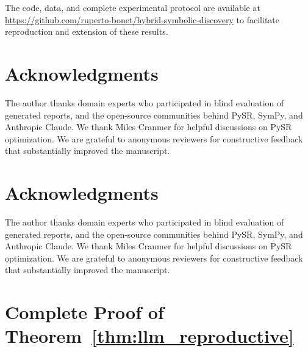 \documentclass[twoside,11pt]{article}
\begin{document}
The code, data, and complete experimental protocol are available at \url{https://github.com/ruperto-bonet/hybrid-symbolic-discovery} to facilitate reproduction and extension of these results.

\section*{Acknowledgments}

The author thanks domain experts who participated in blind evaluation of generated reports, and the open-source communities behind PySR, SymPy, and Anthropic Claude. We thank Miles Cranmer for helpful discussions on PySR optimization. We are grateful to anonymous reviewers for constructive feedback that substantially improved the manuscript.



\section*{Acknowledgments}

The author thanks domain experts who participated in blind evaluation of generated reports, and the open-source communities behind PySR, SymPy, and Anthropic Claude. We thank Miles Cranmer for helpful discussions on PySR optimization. We are grateful to anonymous reviewers for constructive feedback that substantially improved the manuscript.





\appendix

\section{Complete Proof of Theorem~\ref{thm:llm_reproductive}}
\label{app:proof}
\end{document}
